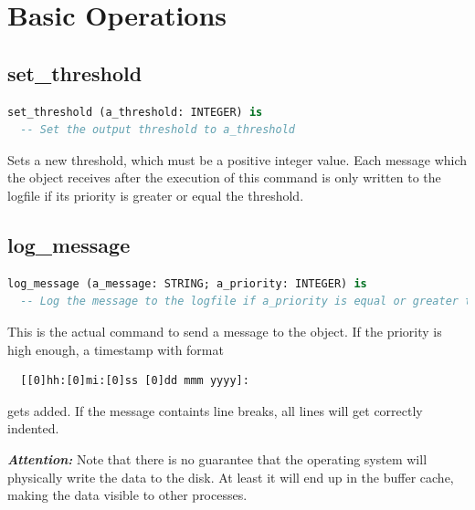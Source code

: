 \documentclass[a4paper,fleqn]{report}
\begin{document}
\section{Basic Operations}
\label{sec:Basic Operations}


\subsection{set\_threshold}
\label{sec:set_threshold}

\begin{lstlisting}[language=Eiffel]
set_threshold (a_threshold: INTEGER) is
  -- Set the output threshold to a_threshold
\end{lstlisting}

Sets a new threshold, which must be a positive integer value. Each
message which the object receives after the execution of this command
is only written to the logfile if its priority is greater or equal the
threshold.


\subsection{log\_message}
\label{sec:log_message}

\begin{lstlisting}[language=Eiffel]
log_message (a_message: STRING; a_priority: INTEGER) is
  -- Log the message to the logfile if a_priority is equal or greater than the threshold
\end{lstlisting}

This is the actual command to send a message to the object. If the
priority is high enough, a timestamp with format

\begin{lstlisting}
  [[0]hh:[0]mi:[0]ss [0]dd mmm yyyy]:
\end{lstlisting}

gets added. If the message containts line breaks, all lines will get
correctly indented.

\textit{\textbf{Attention:}} Note that there is no guarantee that the
operating system will physically write the data to the disk. At least
it will end up in the buffer cache, making the data visible to other
processes.
\end{document}
